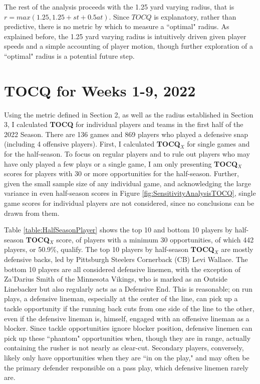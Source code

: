 \documentclass{article}
\begin{document}
The rest of the analysis proceeds with the 1.25 yard varying radius, that is $r = max(1.25, 1.25 + st + 0.5at)$. Since $TOCQ$ is explanatory, rather than predictive, there is no metric by which to measure a ``optimal" radius. As explained before, the 1.25 yard varying radius is intuitively driven given player speeds and a simple accounting of player motion, though further exploration of a ``optimal" radius is a potential future step.

\section{TOCQ for Weeks 1-9, 2022}

Using the metric defined in Section 2, as well as the radius established in Section 3, I calculated \textbf{TOCQ} for individual players and teams in the first half of the 2022 Season. There are 136 games and 869 players who played a defensive snap (including 4 offensive players). First, I calculated \textbf{TOCQ$_X$} for single games and for the half-season. To focus on regular players and to rule out players who may have only played a few plays or a single game, I am only presenting \textbf{TOCQ$_X$} scores for players with 30 or more opportunities for the half-season. Further, given the small sample size of any individual game, and acknowledging the large variance in even half-season scores in Figure \ref{fig:SensitivityAnalysisTOCQ}, single game scores for individual players are not considered, since no conclusions can be drawn from them.

Table \ref{table:HalfSeasonPlayer} shows the top 10 and bottom 10 players by half-season \textbf{TOCQ$_X$} score, of players with a minimum 30 opportunities, of which 442 players, or 50.9\%, qualify. The top 10 players by half-season \textbf{TOCQ$_X$} are mostly defensive backs, led by Pittsburgh Steelers Cornerback (CB) Levi Wallace. The bottom 10 players are all considered defensive linemen, with the exception of Za'Darius Smith of the Minnesota Vikings, who is marked as an Outside Linebacker but also regularly acts as a Defensive End. This is reasonable; on run plays, a defensive lineman, especially at the center of the line, can pick up a tackle opportunity if the running back cuts from one side of the line to the other, even if the defensive lineman is, himself, engaged with an offensive lineman as a blocker. Since tackle opportunities ignore blocker position, defensive linemen can pick up these ``phantom" opportunities when, though they are in range, actually containing the rusher is not nearly as clear-cut. Secondary players, conversely, likely only have opportunities when they are ``in on the play," and may often be the primary defender responsible on a pass play, which defensive linemen rarely are. 
\end{document}
